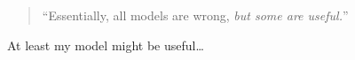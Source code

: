 
\begin{preamble}
    \begin{quote}
        ``Essentially, all models are wrong, \emph{but some are useful.}''
    \end{quote}
    
    At least my model might be useful\ldots
\end{preamble}